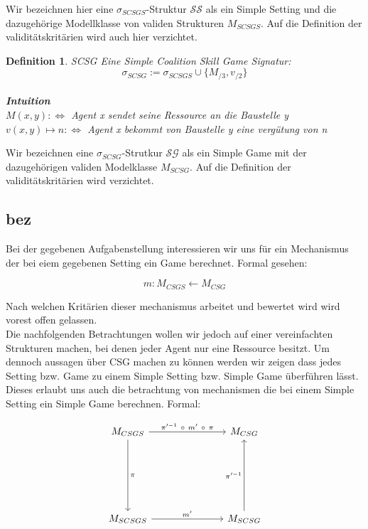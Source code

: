 \documentclass[12pt]{article}
\theoremstyle{break}
\newtheorem{definition}{Definition}
\begin{document}
Wir bezeichnen hier eine $\sigma_{SCSGS}$-Struktur $\mathcal{SS}$ als ein Simple Setting und die dazugehörige Modellklasse von validen Strukturen $M_{SCSGS}$. Auf die Definition der validitätskritärien wird auch hier verzichtet.


\begin{definition}{SCSG}
  Eine Simple Coalition Skill Game Signatur:
  \[ \sigma_{SCSG}:=\sigma_{SCSGS}\cup\{M_{/3}, v_{/2}\} \] 
  \\ \textbf{Intuition} \\
  $M(x, y):\Leftrightarrow$ Agent x sendet seine Ressource an die Baustelle y \\
  $v(x,y)\mapsto n:\Leftrightarrow$ Agent x bekommt von Baustelle y eine vergütung von n
\end{definition}

Wir bezeichnen eine $\sigma_{SCSG}$-Strutkur $\mathcal{SG}$ als ein Simple Game mit der dazugehörigen validen Modelklasse $M_{SCSG}$. Auf die Definition der validitätskritärien wird verzichtet.


\subsection{bez}
\label{bez}

Bei der gegebenen Aufgabenstellung interessieren wir uns für ein Mechanismus der bei eiem gegebenen Setting ein Game berechnet. Formal gesehen:

\begin{equation}
  m: M_{CSGS} \leftarrow M_{CSG}
\end{equation}

Nach welchen Kritärien dieser mechanismus arbeitet und bewertet wird wird vorest offen gelassen.\\

Die nachfolgenden Betrachtungen wollen wir jedoch auf einer vereinfachten Strukturen machen, bei denen jeder Agent nur eine Ressource besitzt. Um dennoch aussagen über CSG machen zu können werden wir zeigen dass jedes Setting bzw. Game zu einem Simple Setting bzw. Simple Game überführen lässt. Dieses erlaubt uns auch die betrachtung von mechanismen die bei einem Simple Setting ein Simple Game berechnen. Formal:

\[
\begin{tikzcd}[column sep=1in,row sep=1in]
M_{CSGS} \arrow{d}{\pi} \arrow{r}{\pi'^{-1}\ \circ\  m'\ \circ\ \pi} & M_{CSG} \\
M_{SCSGS} \arrow{r}{m'} & M_{SCSG} \arrow{u}{\pi'^{-1}}
\end{tikzcd}
\]
\end{document}
